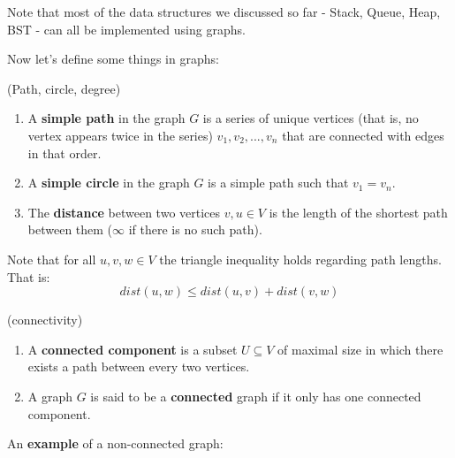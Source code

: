 \begin{remark}
Note that most of the data structures we discussed so far - Stack, Queue, Heap, BST - can all be implemented using graphs.
\end{remark}

Now let's define some things in graphs:

\begin{definition} (Path, circle, degree)
\begin{enumerate} 
\item A \textbf{simple path} in the graph $G$ is a series of unique vertices (that is, no vertex appears twice in the series) $v_1, v_2, ..., v_n$ that are connected with edges in that order. 
\item A \textbf{simple circle} in the graph $G$ is a simple path such that $v_1 = v_n$. 
\item The \textbf{distance} between two vertices $v,u\in V$ is the length of the shortest path between them ($\infty$ if there is no such path).
\end{enumerate}
\end{definition}

\begin{remark}
Note that for all $u,v,w\in V$ the triangle inequality holds regarding path lengths. That is:
$$dist(u,w)\leq dist(u,v) + dist(v, w)$$
\end{remark}

\begin{definition} (connectivity)
\begin{enumerate}
\item A \textbf{connected component} is a subset $U \subseteq V$ of maximal size in which there exists a path between every two vertices. 
\item A graph $G$ is said to be a \textbf{connected} graph if it only has one connected component.
\end{enumerate}
\end{definition}

An \textbf{example} of a non-connected graph: \\ \\ 

